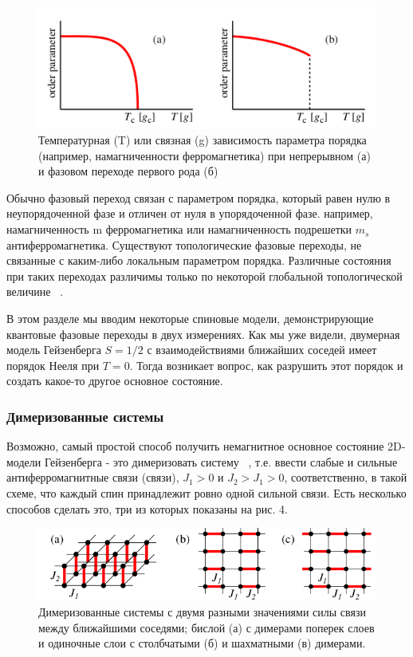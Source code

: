 \documentclass[11pt]{article}
\begin{document}
\begin{figure}[htp]
\centering
\includegraphics[scale=0.5]{fig3}
\caption{Температурная (T) или связная (g) зависимость параметра порядка (например, намагниченности ферромагнетика) при непрерывном (а) и фазовом переходе первого рода (б)}
\label{}
\end{figure}

Обычно фазовый переход связан с параметром порядка, который равен нулю в неупорядоченной фазе и отличен от нуля в упорядоченной фазе. например, намагниченность m ферромагнетика или намагниченность подрешетки $m_s$ антиферромагнетика. Существуют топологические фазовые переходы, не связанные с каким-либо локальным параметром порядка. Различные состояния при таких переходах различимы только по некоторой глобальной топологической величине ~\cite{Wen}.

В этом разделе мы вводим некоторые спиновые модели, демонстрирующие квантовые фазовые переходы в двух измерениях. Как мы уже видели, двумерная модель Гейзенберга $S = 1/2$ с взаимодействиями ближайших соседей имеет порядок Нееля при $T = 0$. Тогда возникает вопрос, как разрушить этот порядок и создать какое-то другое основное состояние.

\subsubsection{Димеризованные системы}
Возможно, самый простой способ получить немагнитное основное состояние 2D-модели Гейзенберга - это димеризовать систему ~\cite{prl_61_2484}, т.е. ввести слабые и сильные антиферромагнитные связи (связи), $J_1> 0$ и $J_2> J_1> 0$, соответственно, в такой схеме, что каждый спин принадлежит ровно одной сильной связи. Есть несколько способов сделать это, три из которых показаны на рис. 4. 

\begin{figure}[htp]
\centering
\includegraphics[scale=0.5]{fig4}
\caption{Димеризованные системы с двумя разными значениями силы связи между ближайшими соседями; бислой (а) с димерами поперек слоев и одиночные слои с столбчатыми (б) и шахматными (в) димерами.}
\label{}
\end{figure}
\end{document}
